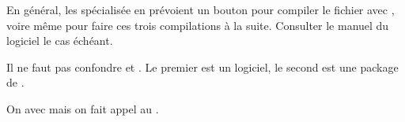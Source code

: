 En général, les  spécialisée en \logiciel{\LaTeX} prévoient un bouton pour compiler le fichier  avec , voire même pour faire ces trois compilations à la suite. Consulter le manuel du logiciel le cas échéant.

\begin{attention}
Il ne faut pas confondre  et . Le premier est un logiciel, le second est une package de \logiciel{\LaTex}.

On  avec  mais on fait appel au  .

\end{attention}



 





